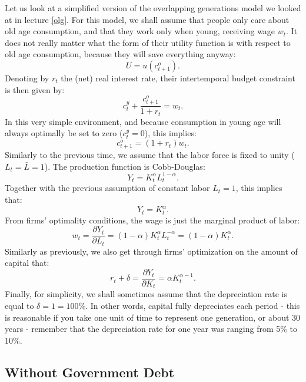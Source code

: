 \documentclass[]{book}
\begin{document}
Let us look at a simplified version of the overlapping generations model
we looked at in lecture \ref{olg}. For this model, we shall assume that
people only care about old age consumption, and that they work only when
young, receiving wage \(w_{t}\). It does not really matter what the form
of their utility function is with respect to old age consumption,
because they will save everything anyway: \[U=u(c_{t+1}^{o}).\] Denoting
by \(r_t\) the (net) real interest rate, their intertemporal budget
constraint is then given by:
\[c_{t}^{y}+\frac{c_{t+1}^{o}}{1+r_t}=w_{t}.\] In this very simple
environment, and because consumption in young age will always optimally
be set to zero (\(c_{t}^{y}=0\)), this implies:
\[c_{t+1}^{o}=(1+r_t)w_{t}.\] Similarly to the previous time, we assume
that the labor force is fixed to unity (\(L_{t}=\bar{L}=1\)). The
production function is Cobb-Douglas:
\[Y_{t}=K_{t}^{\alpha}L_{t}^{1-\alpha}.\] Together with the previous
assumption of constant labor \(L_{t}=1\), this implies that:
\[Y_{t}=K_{t}^{\alpha}.\] From firms' optimality conditions, the wage is
just the marginal product of labor:
\[w_{t}=\frac{\partial Y_{t}}{\partial L_{t}}=(1-\alpha)K_{t}^{\alpha}L_{t}^{-\alpha}=(1-\alpha)K_{t}^{\alpha}.\]
Similarly as previously, we also get through firms' optimization on the
amount of capital that:
\[r_t+\delta=\frac{\partial Y_{t}}{\partial K_{t}}=\alpha K_{t}^{\alpha-1}.\]
Finally, for simplicity, we shall sometimes assume that the depreciation
rate is equal to \(\delta=1=100\%\). In other words, capital fully
depreciates each period - this is reasonable if you take one unit of
time to represent one generation, or about 30 years - remember that the
depreciation rate for one year was ranging from 5\% to 10\%.

\subsection{Without Government Debt}\label{without-government-debt}
\end{document}
